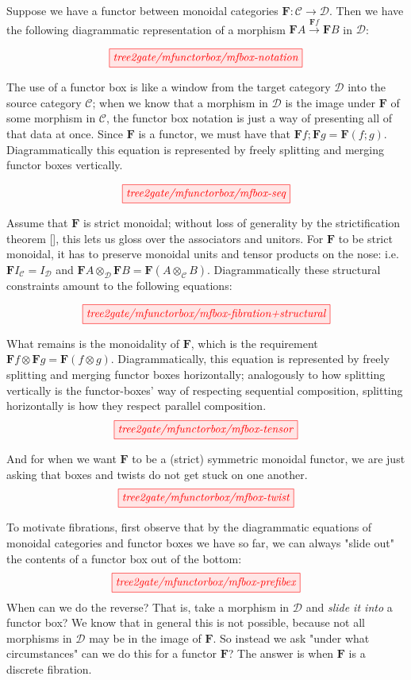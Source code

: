 Suppose we have a functor between monoidal categories $\mathbf{F}: \mathcal{C} \rightarrow \mathcal{D}$. Then we have the following diagrammatic representation of a morphism $\mathbf{F}A \overset{\mathbf{F}f}{\rightarrow} \mathbf{F}B$ in $\mathcal{D}$:

\[\tikzfig{tree2gate/mfunctorbox/mfbox-notation}\]

The use of a functor box is like a window from the target category $\mathcal{D}$ into the source category $\mathcal{C}$; when we know that a morphism in $\mathcal{D}$ is the image under $\mathbf{F}$ of some morphism in $\mathcal{C}$, the functor box notation is just a way of presenting all of that data at once. Since $\mathbf{F}$ is a functor, we must have that $\mathbf{F}f ; \mathbf{F}g = \mathbf{F}(f;g)$. Diagrammatically this equation is represented by freely splitting and merging functor boxes vertically.

\[\tikzfig{tree2gate/mfunctorbox/mfbox-seq}\]

Assume that $\mathbf{F}$ is strict monoidal; without loss of generality by the strictification theorem [], this lets us gloss over the associators and unitors. For $\mathbf{F}$ to be strict monoidal, it has to preserve monoidal units and tensor products on the nose: i.e. $\mathbf{F}I_\mathcal{C} = I_\mathcal{D}$ and $\mathbf{F}A \otimes_\mathcal{D} \mathbf{F}B = \mathbf{F}(A \otimes_\mathcal{C} B)$. Diagrammatically these structural constraints amount to the following equations:

\[\tikzfig{tree2gate/mfunctorbox/mfbox-fibration+structural}\]

What remains is the monoidality of $\mathbf{F}$, which is the requirement $\mathbf{F}f \otimes \mathbf{F}g = \mathbf{F}(f \otimes g)$. Diagrammatically, this equation is represented by freely splitting and merging functor boxes horizontally; analogously to how splitting vertically is the functor-boxes' way of respecting sequential composition, splitting horizontally is how they respect parallel composition.
\[\tikzfig{tree2gate/mfunctorbox/mfbox-tensor}\]

And for when we want $\mathbf{F}$ to be a (strict) symmetric monoidal functor, we are just asking that boxes and twists do not get stuck on one another.
\[\tikzfig{tree2gate/mfunctorbox/mfbox-twist}\]

\begin{remark}
To motivate fibrations, first observe that by the diagrammatic equations of monoidal categories and functor boxes we have so far, we can always "slide out" the contents of a functor box out of the bottom:
\[\tikzfig{tree2gate/mfunctorbox/mfbox-prefibex}\]
When can we do the reverse? That is, take a morphism in $\mathcal{D}$ and \emph{slide it into} a functor box? We know that in general this is not possible, because not all morphisms in $\mathcal{D}$ may be in the image of $\mathbf{F}$. So instead we ask "under what circumstances" can we do this for a functor $\mathbf{F}$? The answer is when $\mathbf{F}$ is a discrete fibration.
\end{remark}

